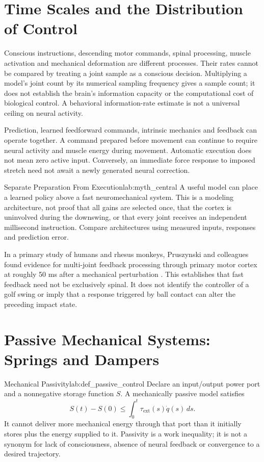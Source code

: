 \section{Time Scales and the Distribution of Control}
\label{sec:comp_problem}

Conscious instructions, descending motor commands, spinal processing, muscle activation and mechanical deformation are different processes. Their rates cannot be compared by treating a joint sample as a conscious decision. Multiplying a model's joint count by its numerical sampling frequency gives a sample count; it does not establish the brain's information capacity or the computational cost of biological control. A behavioral information-rate estimate is not a universal ceiling on neural activity.

Prediction, learned feedforward commands, intrinsic mechanics and feedback can operate together. A command prepared before movement can continue to require neural activity and muscle energy during movement. Automatic execution does not mean zero active input. Conversely, an immediate force response to imposed stretch need not await a newly generated neural correction.

\begin{principle}{Separate Preparation From Execution}{lab:myth_central}
A useful model can place a learned policy above a fast neuromechanical system. This is a modeling architecture, not proof that all gains are selected once, that the cortex is uninvolved during the downswing, or that every joint receives an independent millisecond instruction. Compare architectures using measured inputs, responses and prediction error.
\end{principle}

In a primary study of humans and rhesus monkeys, Pruszynski and colleagues found evidence for multi-joint feedback processing through primary motor cortex at roughly 50 ms after a mechanical perturbation \citep{Pruszynski2011Feedback}. This establishes that fast feedback need not be exclusively spinal. It does not identify the controller of a golf swing or imply that a response triggered by ball contact can alter the preceding impact state.

\section{Passive Mechanical Systems: Springs and Dampers}
\label{sec:passive_mechanics}

\begin{definition}{Mechanical Passivity}{lab:def_passive_control}
Declare an input/output power port and a nonnegative storage function $S$. A mechanically passive model satisfies
\[
S(t)-S(0)\leq\int_0^t \tau_{\mathrm{ext}}(s)\dot q(s)\,ds.
\]
It cannot deliver more mechanical energy through that port than it initially stores plus the energy supplied to it. Passivity is a work inequality; it is not a synonym for lack of consciousness, absence of neural feedback or convergence to a desired trajectory.
\end{definition}

